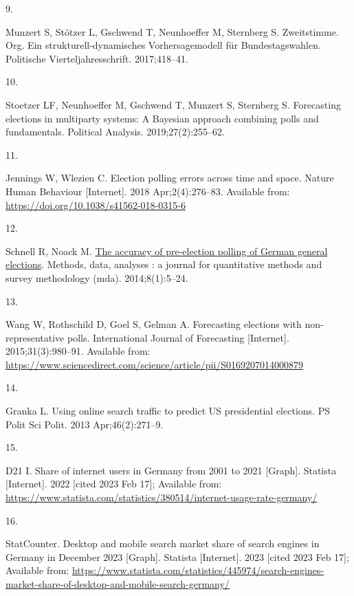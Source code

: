 \documentclass[
  letterpaper,
  DIV=11,
  numbers=noendperiod]{scrartcl}
\newlength{\cslhangindent}
\newlength{\csllabelwidth}
\newlength{\cslentryspacingunit} %
\newenvironment{CSLReferences}[2] %
 {%
  \setlength{\parindent}{0pt}
  \ifodd #1
  \let\oldpar\par
  \def\par{\hangindent=\cslhangindent\oldpar}
  \fi
  \setlength{\parskip}{#2\cslentryspacingunit}
 }%
 {}
\newcommand{\CSLLeftMargin}[1]{\parbox[t]{\csllabelwidth}{#1}}
\newcommand{\CSLRightInline}[1]{\parbox[t]{\linewidth - \csllabelwidth}{#1}\break}
\begin{document}
\begin{CSLReferences}{0}{0}
\leavevmode{}%
\CSLLeftMargin{9. }%
\CSLRightInline{Munzert S, Stötzer L, Gschwend T, Neunhoeffer M,
Sternberg S. Zweitstimme. Org. {Ein} strukturell-dynamisches
{Vorhersagemodell} für {Bundestagswahlen}. Politische
Vierteljahresschrift. 2017;418--41. }

\leavevmode{}%
\CSLLeftMargin{10. }%
\CSLRightInline{Stoetzer LF, Neunhoeffer M, Gschwend T, Munzert S,
Sternberg S. Forecasting elections in multiparty systems: A {Bayesian}
approach combining polls and fundamentals. Political Analysis.
2019;27(2):255--62. }

\leavevmode{}%
\CSLLeftMargin{11. }%
\CSLRightInline{Jennings W, Wlezien C. Election polling errors across
time and space. Nature Human Behaviour {[}Internet{]}. 2018
Apr;2(4):276--83. Available from:
\url{https://doi.org/10.1038/s41562-018-0315-6}}

\leavevmode{}%
\CSLLeftMargin{12. }%
\CSLRightInline{Schnell R, Noack M.
\href{https://doi.org/10.12758/mda.2014.001}{The accuracy of
pre-election polling of {German} general elections}. Methods, data,
analyses : a journal for quantitative methods and survey methodology
(mda). 2014;8(1):5--24. }

\leavevmode{}%
\CSLLeftMargin{13. }%
\CSLRightInline{Wang W, Rothschild D, Goel S, Gelman A. Forecasting
elections with non-representative polls. International Journal of
Forecasting {[}Internet{]}. 2015;31(3):980--91. Available from:
\url{https://www.sciencedirect.com/science/article/pii/S0169207014000879}}

\leavevmode{}%
\CSLLeftMargin{14. }%
\CSLRightInline{Granka L. Using online search traffic to predict {US}
presidential elections. PS Polit Sci Polit. 2013 Apr;46(2):271--9. }

\leavevmode{}%
\CSLLeftMargin{15. }%
\CSLRightInline{D21 I. Share of internet users in {Germany} from 2001 to
2021 {[}{Graph}{]}. Statista {[}Internet{]}. 2022 {[}cited 2023 Feb
17{]}; Available from:
\url{https://www.statista.com/statistics/380514/internet-usage-rate-germany/}}

\leavevmode{}%
\CSLLeftMargin{16. }%
\CSLRightInline{StatCounter. Desktop and mobile search market share of
search engines in {Germany} in {December} 2023 {[}{Graph}{]}. Statista
{[}Internet{]}. 2023 {[}cited 2023 Feb 17{]}; Available from:
\url{https://www.statista.com/statistics/445974/search-engines-market-share-of-desktop-and-mobile-search-germany/}}


\end{CSLReferences}
\end{document}
